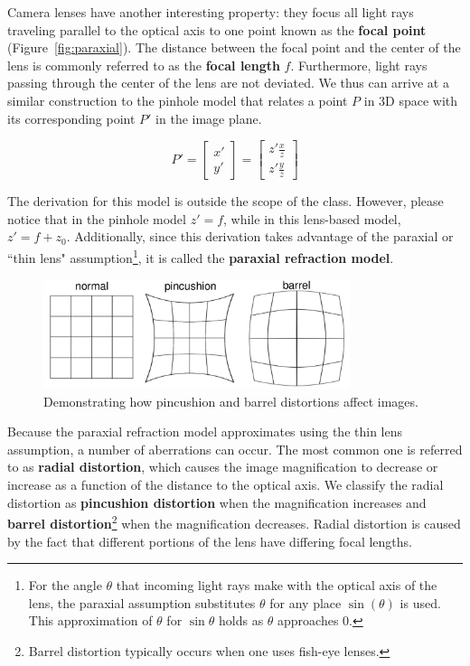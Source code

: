 \documentclass[a4paper, 12pt]{article}
\renewcommand\emph{\textbf}
\begin{document}
Camera lenses have another interesting property: they focus all light rays traveling parallel to the optical axis to one point known as the \emph{focal point} (Figure~\ref{fig:paraxial}). The distance between the focal point and the center of the lens is commonly referred to as the \emph{focal length} $f$. Furthermore, light rays passing through the center of the lens are not deviated. We thus can arrive at a similar construction to the pinhole model that relates a point $P$ in 3D space with its corresponding point $P'$ in the image plane. 

\begin{equation}
    P' = \begin{bmatrix}x'\\ y'\end{bmatrix} = \begin{bmatrix}z'\frac{x}{z} \\ z'\frac{y}{z}\end{bmatrix}
\end{equation}

The derivation for this model is outside the scope of the class. However, please notice that in the pinhole model $z' = f$, while in this lens-based model, $z' = f+z_0$.  Additionally, since this derivation takes advantage of the paraxial or ``thin lens" assumption\footnote{For the angle $\theta$ that incoming light rays make with the optical axis of the lens, the paraxial assumption substitutes $\theta$ for any place $\sin(\theta)$ is used. This approximation of $\theta$ for $\sin\theta$ holds as $\theta$ approaches 0.}, it is called the \textbf{paraxial refraction model}.

\begin{figure}[h!]
\centering
\includegraphics[width=0.8\textwidth]{figures/1-6.pdf}
\caption{Demonstrating how pincushion and barrel distortions affect images.}
\label{fig:distortion}
\end{figure}

Because the paraxial refraction model approximates using the thin lens assumption, a number of aberrations can occur. The most common one is referred to as \emph{radial distortion}, which causes the image magnification to decrease or increase as a function of the distance to the optical axis. We classify the radial distortion as \emph{pincushion distortion} when the magnification increases and \emph{barrel distortion}\footnote{Barrel distortion typically occurs when one uses fish-eye lenses.} when the magnification decreases. Radial distortion is caused by the fact that different portions of the lens have differing focal lengths.
\end{document}
